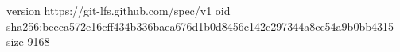 version https://git-lfs.github.com/spec/v1
oid sha256:beeca572e16cff434b336baea676d1b0d8456c142c297344a8cc54a9b0bb4315
size 9168
